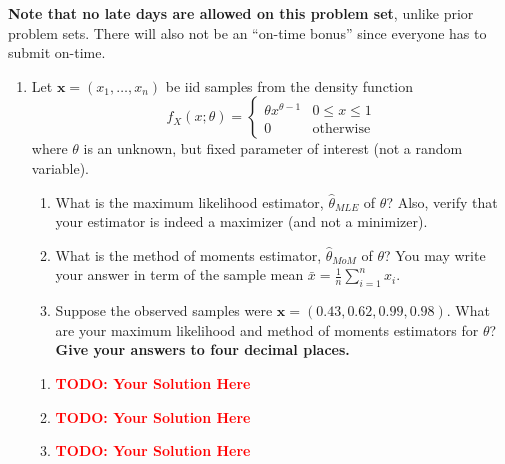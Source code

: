 \documentclass[12pt]{article}
\def\todo#1{\textcolor{red}{\textbf{#1}}}
\renewcommand{\|}{\mid}
\begin{document}
\textbf{Note that no late days are allowed on this problem set}, unlike prior problem sets. There will also not be an ``on-time bonus'' since everyone has to submit on-time.

\begin{enumerate}
    \item Let $\mathbf{x}=(x_1,\dots,x_n)$ be iid samples from the density function
    $$f_X(x;\theta)=\begin{cases}\theta x^{\theta-1} & 0\le x\le 1\\ 0 & \text{otherwise}\end{cases}$$
    where $\theta$ is an unknown, but fixed parameter of interest (not a random variable). 
    \begin{enumerate}
        \item What is the maximum likelihood estimator, $\hat{\theta}_{MLE}$ of $\theta$? Also, verify that your estimator is indeed a maximizer (and not a minimizer).
        \item What is the method of moments estimator, $\hat{\theta}_{MoM}$ of $\theta$? You may write your answer in term of the sample mean $\bar{x}=\frac{1}{n}\sum_{i=1}^n x_i$.
        \item Suppose the observed samples were $\mathbf{x}=(0.43,0.62,0.99,0.98)$. What are your maximum likelihood and method of moments estimators for $\theta$? \textbf{Give your answers to four decimal places.}
    \end{enumerate}
\begin{tcolorbox}
\begin{enumerate}
\item \todo{TODO: Your Solution Here}
\item \todo{TODO: Your Solution Here}
\item \todo{TODO: Your Solution Here}
\end{enumerate}
\end{tcolorbox}


\end{enumerate}
\end{document}
